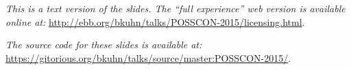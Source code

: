\begin{center}
\textit{
This is a text version of the slides. The ``full experience'' web version is available
online at:} \url{http://ebb.org/bkuhn/talks/POSSCON-2015/licensing.html}.

\textit{The source code for these slides is available at:}
  \url{https://gitorious.org/bkuhn/talks/source/master:POSSCON-2015/}.

\end{center}
